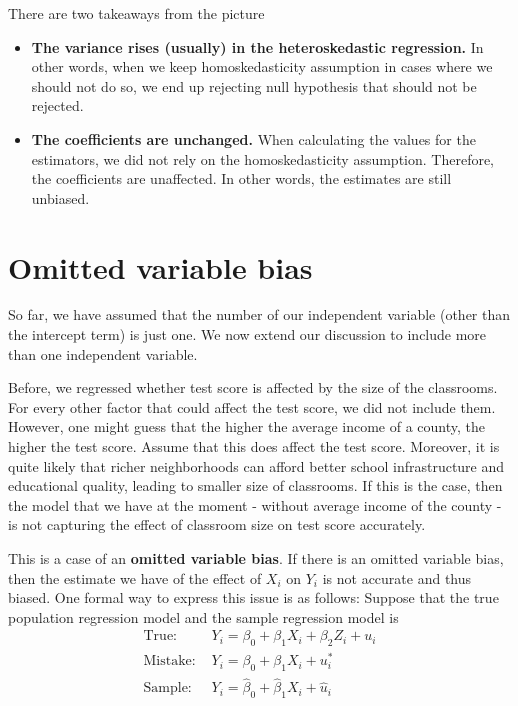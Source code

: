There are two takeaways from the picture
\begin{itemize}
\item \textbf{The variance rises (usually) in the heteroskedastic regression.} In other words, when we keep homoskedasticity assumption in cases where we should not do so, we end up rejecting null hypothesis that should not be rejected.
\item \textbf{The coefficients are unchanged.} When calculating the values for the estimators, we did not rely on the homoskedasticity assumption. Therefore, the coefficients are unaffected. In other words, the estimates are still unbiased.
\end{itemize}

\section{Omitted variable bias}
So far, we have assumed that the number of our independent variable (other than the intercept term) is just one. We now extend our discussion to include more than one independent variable. 
\par\medskip
Before, we regressed whether test score is affected by the size of the classrooms. For every other factor that could affect the test score, we did not include them. However, one might guess that the higher the average income of a county, the higher the test score. Assume that this does affect the test score. Moreover, it is quite likely that richer neighborhoods can afford better school infrastructure and educational quality, leading to smaller size of classrooms. If this is the case, then the model that we have at the moment - without average income of the county - is not capturing the effect of classroom size on test score accurately. \par\medskip 
This is a case of an \textbf{omitted variable bias}. If there is an omitted variable bias, then the estimate we have of the effect of $X_i$ on $Y_i$ is not accurate and thus biased. One formal way to express this issue is as follows: Suppose that the true population regression model and the sample regression model is 
\[
\begin{aligned}
\text{True: }& Y_i = \beta_0 + \beta_1 X_i + \beta_2 Z_i+u_i\\
\text{Mistake: }& Y_i = \beta_0 + \beta_1 X_i + u_i^*\\
\text{Sample: }& Y_i = \hat{\beta}_0 + \hat{\beta}_1 X_i+ \hat{u}_i\\
\end{aligned}
\]
